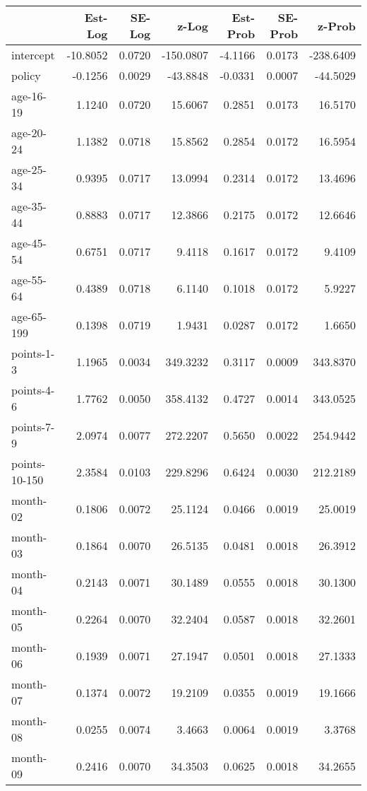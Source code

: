 \documentclass[10pt]{article}
\begin{document}
\begin{table}[ht]
\centering
\begin{tabular}{lrrrrrr}
  \hline
 & Est-Log & SE-Log & z-Log & Est-Prob & SE-Prob & z-Prob \\ 
  \hline
intercept & -10.8052 & 0.0720 & -150.0807 & -4.1166 & 0.0173 & -238.6409 \\ 
  policy & -0.1256 & 0.0029 & -43.8848 & -0.0331 & 0.0007 & -44.5029 \\ 
  age-16-19 & 1.1240 & 0.0720 & 15.6067 & 0.2851 & 0.0173 & 16.5170 \\ 
  age-20-24 & 1.1382 & 0.0718 & 15.8562 & 0.2854 & 0.0172 & 16.5954 \\ 
  age-25-34 & 0.9395 & 0.0717 & 13.0994 & 0.2314 & 0.0172 & 13.4696 \\ 
  age-35-44 & 0.8883 & 0.0717 & 12.3866 & 0.2175 & 0.0172 & 12.6646 \\ 
  age-45-54 & 0.6751 & 0.0717 & 9.4118 & 0.1617 & 0.0172 & 9.4109 \\ 
  age-55-64 & 0.4389 & 0.0718 & 6.1140 & 0.1018 & 0.0172 & 5.9227 \\ 
  age-65-199 & 0.1398 & 0.0719 & 1.9431 & 0.0287 & 0.0172 & 1.6650 \\ 
  points-1-3 & 1.1965 & 0.0034 & 349.3232 & 0.3117 & 0.0009 & 343.8370 \\ 
  points-4-6 & 1.7762 & 0.0050 & 358.4132 & 0.4727 & 0.0014 & 343.0525 \\ 
  points-7-9 & 2.0974 & 0.0077 & 272.2207 & 0.5650 & 0.0022 & 254.9442 \\ 
  points-10-150 & 2.3584 & 0.0103 & 229.8296 & 0.6424 & 0.0030 & 212.2189 \\ 
  month-02 & 0.1806 & 0.0072 & 25.1124 & 0.0466 & 0.0019 & 25.0019 \\ 
  month-03 & 0.1864 & 0.0070 & 26.5135 & 0.0481 & 0.0018 & 26.3912 \\ 
  month-04 & 0.2143 & 0.0071 & 30.1489 & 0.0555 & 0.0018 & 30.1300 \\ 
  month-05 & 0.2264 & 0.0070 & 32.2404 & 0.0587 & 0.0018 & 32.2601 \\ 
  month-06 & 0.1939 & 0.0071 & 27.1947 & 0.0501 & 0.0018 & 27.1333 \\ 
  month-07 & 0.1374 & 0.0072 & 19.2109 & 0.0355 & 0.0019 & 19.1666 \\ 
  month-08 & 0.0255 & 0.0074 & 3.4663 & 0.0064 & 0.0019 & 3.3768 \\ 
  month-09 & 0.2416 & 0.0070 & 34.3503 & 0.0625 & 0.0018 & 34.2655 \\ 

\end{tabular}
\end{table}
\end{document}
